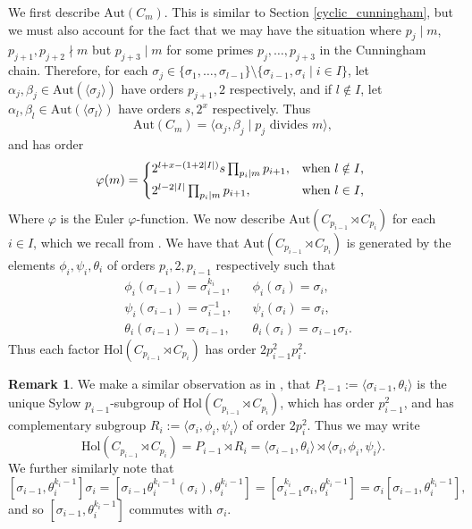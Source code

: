 \documentclass[a4paper,reqno]{amsart}
\theoremstyle{definition}
\newtheorem{remark}[theorem]{Remark}
\newcommand{\Aut}{\mathrm{Aut}}
\newcommand{\Hol}{\mathrm{Hol}}
\begin{document}
We first describe $\Aut(C_m)$. This is similar to Section \ref{cyclic_cunningham}, but we must also account for the fact that we may have the situation where $p_j \mid m$, $p_{j+1},p_{j+2} \nmid m$ but $p_{j+3} \mid m$ for some primes $p_j,\ldots,p_{j+3}$ in the Cunningham chain. Therefore, for each $\sigma_j \in \{\sigma_1,\ldots,\sigma_{l-1}\}\setminus\{\sigma_{i-1},\sigma_i \mid i \in I\}$, let $\alpha_j,\beta_j \in \Aut(\langle\sigma_j\rangle)$ have orders $p_{j+1},2$ respectively, and if $l \notin I$, let $\alpha_l,\beta_l \in \Aut(\langle\sigma_l\rangle)$ have orders $s,2^x$ respectively. Thus
\[\Aut(C_m) = \langle \alpha_j,\beta_j \mid p_j \text{ divides } m \rangle,\]
and has order
\[
\varphi(m)=
\begin{cases*}
    2^{l+x-(1+2|I|)}s\prod_{p_i \mid m}p_{i+1}, & when $l \notin I$,\\
    2^{l-2|I|}\prod_{p_i \mid m}p_{i+1}, & when $l \in I$,
\end{cases*}
\]
Where $\varphi$ is the Euler $\varphi$-function. We now describe $\Aut(C_{p_{i-1}} \rtimes C_{p_i})$ for each $i \in I$, which we recall from \cite{BML21}. We have that $\Aut(C_{p_{i-1}} \rtimes C_{p_i})$ is generated by the elements $\phi_i,\psi_i,\theta_i$ of orders $p_i,2,p_{i-1}$ respectively such that
\begin{align*}
	&\phi_i(\sigma_{i-1})=\sigma_{i-1}^{k_i},
        &&\phi_i(\sigma_i)=\sigma_i,\\
	&\psi_i(\sigma_{i-1})=\sigma_{i-1}^{-1},
	&&\psi_i(\sigma_i)=\sigma_i,\\
	&\theta_i(\sigma_{i-1})=\sigma_{i-1},
	&&\theta_i(\sigma_i)=\sigma_{i-1}\sigma_i.	
\end{align*}
Thus each factor $\Hol(C_{p_{i-1}}\rtimes C_{p_i})$ has order $2p_{i-1}^2p_i^2$.
\begin{remark}\label{commuting_elements}
    We make a similar observation as in \cite{BML21}, that $P_{i-1}:=\langle \sigma_{i-1},\theta_i \rangle$ is the unique Sylow $p_{i-1}$-subgroup of $\Hol(C_{p_{i-1}}\rtimes C_{p_i})$, which has order $p_{i-1}^2$, and has complementary subgroup $R_i:=\langle \sigma_i,\phi_i,\psi_i \rangle$ of order $2p_i^2$. Thus we may write
    \[\Hol(C_{p_{i-1}}\rtimes C_{p_i})=P_{i-1}\rtimes R_i=\langle \sigma_{i-1},\theta_i \rangle \rtimes \langle \sigma_i,\phi_i,\psi_i \rangle.\]
    We further similarly note that
    \[[\sigma_{i-1},\theta_i^{k_i-1}]\sigma_i=[\sigma_{i-1}\theta_i^{k_i-1}(\sigma_i),\theta_i^{k_i-1}]=[\sigma_{i-1}^{k_i}\sigma_i,\theta_i^{k_i-1}]=\sigma_i[\sigma_{i-1},\theta_i^{k_i-1}],\]
    and so $[\sigma_{i-1},\theta_i^{k_i-1}]$ commutes with $\sigma_i$.
\end{remark}
\end{document}
